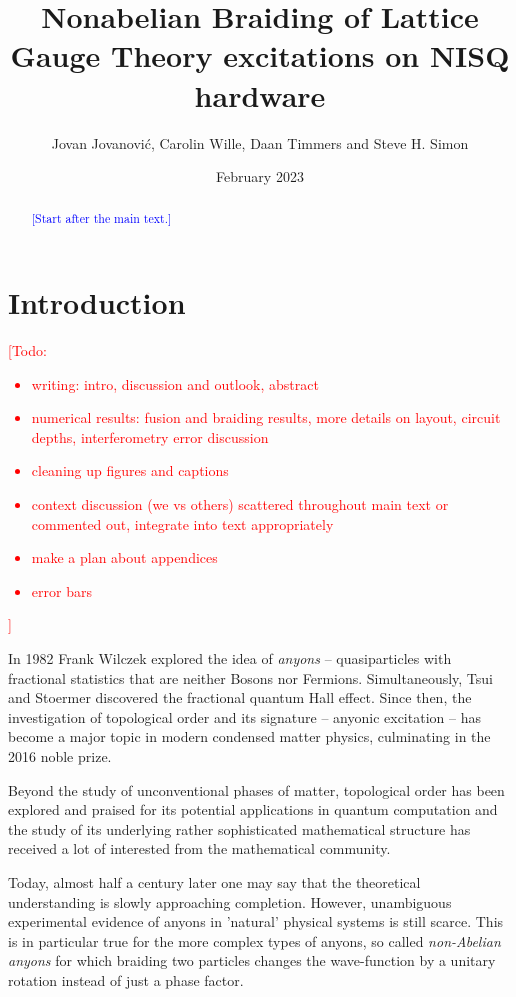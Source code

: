 \documentclass[two column]{article}
\title{Nonabelian Braiding of Lattice Gauge Theory excitations on NISQ hardware}
\author{Jovan Jovanovi\'c, Carolin Wille, Daan Timmers and Steve H. Simon}
\date{February 2023}
\newcommand{\caro}[1]{\textcolor{red}{[#1]}}
\newcommand{\jovan}[1]{\textcolor{blue}{[#1]}}
\begin{document}
\maketitle
\begin{abstract}
\jovan{Start after the main text.}
\end{abstract}
\tableofcontents



\section{Introduction}
\caro{Todo: \begin{itemize}
	\item writing: intro, discussion and outlook, abstract
	\item numerical results: fusion and braiding results, more details on layout, circuit depths, interferometry error discussion
	\item cleaning up figures and captions
	\item context discussion (we vs others) scattered throughout main text or commented out, integrate into text appropriately
	\item make a plan about appendices
	\item error bars
\end{itemize}
}

In 1982 Frank Wilczek explored the idea of \emph{anyons} -- quasiparticles with fractional statistics that are neither Bosons nor Fermions. Simultaneously, Tsui and Stoermer discovered the fractional quantum Hall effect. Since then, the investigation of topological order and its signature -- anyonic excitation -- has become a major topic in modern condensed matter physics, culminating in the 2016 noble prize. 



Beyond the study of unconventional phases of matter, topological order has been explored and praised for its potential applications in quantum computation and the study of its underlying rather sophisticated mathematical structure has received a lot of interested from the mathematical community. 


Today, almost half a century later one may say that the theoretical understanding is slowly approaching completion. However, unambiguous experimental evidence of anyons in 'natural' physical systems is still scarce. This is in particular true for the more complex types of anyons, so called \emph{non-Abelian anyons} for which  braiding two particles changes the wave-function by a unitary rotation instead of just a phase factor.
\end{document}
